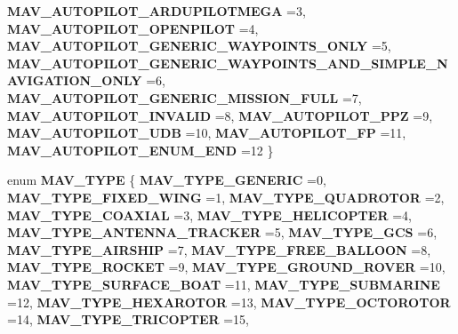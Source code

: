\begin{DoxyCompactItemize}
\textbf{ M\+A\+V\+\_\+\+A\+U\+T\+O\+P\+I\+L\+O\+T\+\_\+\+A\+R\+D\+U\+P\+I\+L\+O\+T\+M\+E\+GA} =3, 
\textbf{ M\+A\+V\+\_\+\+A\+U\+T\+O\+P\+I\+L\+O\+T\+\_\+\+O\+P\+E\+N\+P\+I\+L\+OT} =4, 
\newline
\textbf{ M\+A\+V\+\_\+\+A\+U\+T\+O\+P\+I\+L\+O\+T\+\_\+\+G\+E\+N\+E\+R\+I\+C\+\_\+\+W\+A\+Y\+P\+O\+I\+N\+T\+S\+\_\+\+O\+N\+LY} =5, 
\textbf{ M\+A\+V\+\_\+\+A\+U\+T\+O\+P\+I\+L\+O\+T\+\_\+\+G\+E\+N\+E\+R\+I\+C\+\_\+\+W\+A\+Y\+P\+O\+I\+N\+T\+S\+\_\+\+A\+N\+D\+\_\+\+S\+I\+M\+P\+L\+E\+\_\+\+N\+A\+V\+I\+G\+A\+T\+I\+O\+N\+\_\+\+O\+N\+LY} =6, 
\textbf{ M\+A\+V\+\_\+\+A\+U\+T\+O\+P\+I\+L\+O\+T\+\_\+\+G\+E\+N\+E\+R\+I\+C\+\_\+\+M\+I\+S\+S\+I\+O\+N\+\_\+\+F\+U\+LL} =7, 
\textbf{ M\+A\+V\+\_\+\+A\+U\+T\+O\+P\+I\+L\+O\+T\+\_\+\+I\+N\+V\+A\+L\+ID} =8, 
\newline
\textbf{ M\+A\+V\+\_\+\+A\+U\+T\+O\+P\+I\+L\+O\+T\+\_\+\+P\+PZ} =9, 
\textbf{ M\+A\+V\+\_\+\+A\+U\+T\+O\+P\+I\+L\+O\+T\+\_\+\+U\+DB} =10, 
\textbf{ M\+A\+V\+\_\+\+A\+U\+T\+O\+P\+I\+L\+O\+T\+\_\+\+FP} =11, 
\textbf{ M\+A\+V\+\_\+\+A\+U\+T\+O\+P\+I\+L\+O\+T\+\_\+\+E\+N\+U\+M\+\_\+\+E\+ND} =12
 \}
\item 
enum \textbf{ M\+A\+V\+\_\+\+T\+Y\+PE} \{ \newline
\textbf{ M\+A\+V\+\_\+\+T\+Y\+P\+E\+\_\+\+G\+E\+N\+E\+R\+IC} =0, 
\textbf{ M\+A\+V\+\_\+\+T\+Y\+P\+E\+\_\+\+F\+I\+X\+E\+D\+\_\+\+W\+I\+NG} =1, 
\textbf{ M\+A\+V\+\_\+\+T\+Y\+P\+E\+\_\+\+Q\+U\+A\+D\+R\+O\+T\+OR} =2, 
\textbf{ M\+A\+V\+\_\+\+T\+Y\+P\+E\+\_\+\+C\+O\+A\+X\+I\+AL} =3, 
\newline
\textbf{ M\+A\+V\+\_\+\+T\+Y\+P\+E\+\_\+\+H\+E\+L\+I\+C\+O\+P\+T\+ER} =4, 
\textbf{ M\+A\+V\+\_\+\+T\+Y\+P\+E\+\_\+\+A\+N\+T\+E\+N\+N\+A\+\_\+\+T\+R\+A\+C\+K\+ER} =5, 
\textbf{ M\+A\+V\+\_\+\+T\+Y\+P\+E\+\_\+\+G\+CS} =6, 
\textbf{ M\+A\+V\+\_\+\+T\+Y\+P\+E\+\_\+\+A\+I\+R\+S\+H\+IP} =7, 
\newline
\textbf{ M\+A\+V\+\_\+\+T\+Y\+P\+E\+\_\+\+F\+R\+E\+E\+\_\+\+B\+A\+L\+L\+O\+ON} =8, 
\textbf{ M\+A\+V\+\_\+\+T\+Y\+P\+E\+\_\+\+R\+O\+C\+K\+ET} =9, 
\textbf{ M\+A\+V\+\_\+\+T\+Y\+P\+E\+\_\+\+G\+R\+O\+U\+N\+D\+\_\+\+R\+O\+V\+ER} =10, 
\textbf{ M\+A\+V\+\_\+\+T\+Y\+P\+E\+\_\+\+S\+U\+R\+F\+A\+C\+E\+\_\+\+B\+O\+AT} =11, 
\newline
\textbf{ M\+A\+V\+\_\+\+T\+Y\+P\+E\+\_\+\+S\+U\+B\+M\+A\+R\+I\+NE} =12, 
\textbf{ M\+A\+V\+\_\+\+T\+Y\+P\+E\+\_\+\+H\+E\+X\+A\+R\+O\+T\+OR} =13, 
\textbf{ M\+A\+V\+\_\+\+T\+Y\+P\+E\+\_\+\+O\+C\+T\+O\+R\+O\+T\+OR} =14, 
\textbf{ M\+A\+V\+\_\+\+T\+Y\+P\+E\+\_\+\+T\+R\+I\+C\+O\+P\+T\+ER} =15, 
\newline

\end{DoxyCompactItemize}
